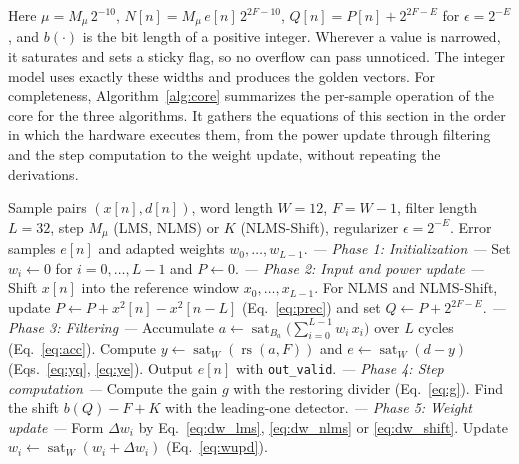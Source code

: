 Here $\mu=M_\mu\,2^{-10}$, $N[n]=M_\mu\,e[n]\,2^{2F-10}$, $Q[n]=P[n]+2^{2F-E}$ for $\epsilon=2^{-E}$, and
$b(\cdot)$ is the bit length of a positive integer. Wherever a value is narrowed, it saturates and sets a
sticky flag, so no overflow can pass unnoticed. The integer model uses exactly these widths and produces the golden vectors. For completeness,
Algorithm~\ref{alg:core} summarizes the per-sample operation of the core for the three algorithms. It
gathers the equations of this section in the order in which the hardware executes them, from the power
update through filtering and the step computation to the weight update, without repeating the
derivations.

\begin{algorithm}[!htbp]
\caption{Per-sample operation of the ULLAP core (LMS, NLMS and NLMS-Shift)}\label{alg:core}
\footnotesize
\algrenewcommand{}%
\algrenewcommand{}%
\newcommand{\Phase}[1]{\Statex\hspace*{\algorithmicindent}\textit{--- #1 ---}}%
\begin{algorithmic}[1]
\Require Sample pairs $(x[n],d[n])$, word length $W=12$, $F=W-1$, filter length $L=32$, step $M_\mu$ (LMS, NLMS) or $K$ (NLMS-Shift), regularizer $\epsilon=2^{-E}$.
\Ensure Error samples $e[n]$ and adapted weights $w_0,\dots,w_{L-1}$.
\Phase{Phase 1: Initialization}
\State Set $w_i \gets 0$ for $i=0,\dots,L-1$ and $P \gets 0$.
\Phase{Phase 2: Input and power update}
  \State Shift $x[n]$ into the reference window $x_0,\dots,x_{L-1}$.
  \State For NLMS and NLMS-Shift, update $P \gets P + x^2[n] - x^2[n-L]$ (Eq.~\eqref{eq:prec}) and set $Q \gets P+2^{2F-E}$.
\Phase{Phase 3: Filtering}
  \State Accumulate $a \gets \operatorname{sat}_{B_a}\big(\sum_{i=0}^{L-1} w_i\,x_i\big)$ over $L$ cycles (Eq.~\eqref{eq:acc}).
  \State Compute $y \gets \operatorname{sat}_W(\operatorname{rs}(a,F))$ and $e \gets \operatorname{sat}_W(d-y)$ (Eqs.~\eqref{eq:yq}, \eqref{eq:ye}).
  \State Output $e[n]$ with \texttt{out\_valid}.
\Phase{Phase 4: Step computation}
    \State Compute the gain $g$ with the restoring divider (Eq.~\eqref{eq:g}).
    \State Find the shift $b(Q)-F+K$ with the leading-one detector.
  \EndIf
\Phase{Phase 5: Weight update}
      \State Form $\Delta w_i$ by Eq.~\eqref{eq:dw_lms}, \eqref{eq:dw_nlms} or \eqref{eq:dw_shift}.
      \State Update $w_i \gets \operatorname{sat}_W(w_i+\Delta w_i)$ (Eq.~\eqref{eq:wupd}).
    \EndFor
  \EndIf
\EndFor
\end{algorithmic}
\end{algorithm}

